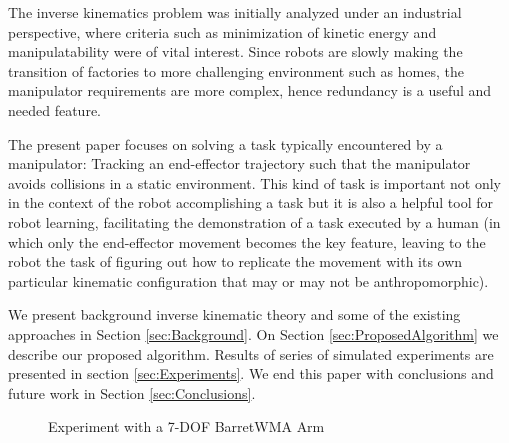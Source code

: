 \documentclass[conference]{IEEEtran}
\begin{document}
The inverse kinematics problem was initially analyzed under an industrial
perspective, where criteria such as minimization of kinetic energy and manipulatability
were of vital interest. Since robots are slowly making the transition
of factories to more challenging environment such as homes, the manipulator requirements
are more complex, hence redundancy is a useful and needed feature.
 
The present paper focuses on solving a task typically encountered by a 
manipulator: Tracking an end-effector trajectory
such that the manipulator avoids collisions in a static
environment. This kind of task is important not only in the context of the robot
accomplishing a task but it is also a helpful tool for robot learning, facilitating
the demonstration of a task executed by a human (in which only the end-effector movement becomes 
the key feature, leaving to the robot the task of figuring out how to replicate the movement with
its own particular kinematic configuration that may or may not be anthropomorphic). 

We present background inverse kinematic theory and some of the existing approaches in Section \ref{sec:Background}. 
On Section \ref{sec:ProposedAlgorithm} we describe our proposed
algorithm. Results of series of simulated experiments are presented in section \ref{sec:Experiments}. 
We end this paper with conclusions and future work in Section \ref{sec:Conclusions}.
\begin{figure}[]
  \centering
  \caption{ Experiment with a 7-DOF BarretWMA Arm}
  \label{fig:CoverFigure}
\end{figure}
\end{document}
